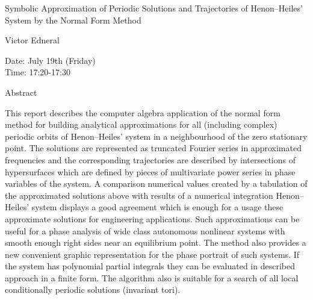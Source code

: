 \begin{center}
\LARGE
Symbolic Approximation of Periodic Solutions and
 Trajectories of Henon--Heiles' System by the Normal Form
                             Method

\end{center}

\begin{center}
\Large
Victor Edneral

\end{center}

\noindent
Date:  July 19th (Friday)\\
Time: 17:20-17:30\\

\begin{center}
\large
Abstract
\end{center}

This report describes the computer algebra application of the normal form method for building
analytical approximations for all (including complex) periodic orbits of Henon--Heiles' system in
a neighbourhood of the zero stationary point. The solutions are represented as truncated Fourier
series in approximated frequencies and the corresponding trajectories are described by
intersections of hypersurfaces which are defined by pieces of multivariate power series in phase
variables of the system. A comparison numerical values created by a tabulation of the
approximated solutions above with results of a numerical integration Henon--Heiles' system
displays a good agreement which is enough for a usage these approximate solutions for engineering
applications. Such approximations can be useful for a phase analysis of wide class autonomous
nonlinear systems with smooth enough right sides near an equilibrium point. The method also
provides a new convenient graphic representation for the phase portrait of such systems. If the
system has polynomial partial integrals they can be evaluated in described approach in a finite
form. The algorithm also is suitable for a search of all local conditionally periodic solutions
(invariant tori). 

